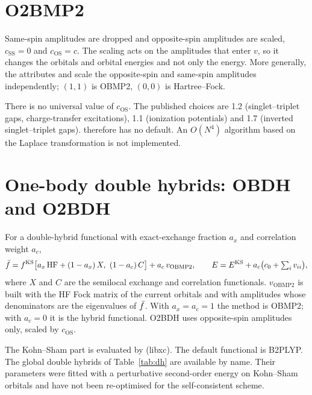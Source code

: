 \section{O2BMP2}
\label{sec:theory-o2bmp2}

Same-spin amplitudes are dropped and opposite-spin amplitudes are scaled,
$c_{\mathrm{SS}}=0$ and $c_{\mathrm{OS}}=c$. The scaling acts on the amplitudes
that enter $v$, so it changes the orbitals and orbital energies and not only
the energy. More generally, the attributes  and  scale
the opposite-spin and same-spin amplitudes independently; $(1,1)$ is OBMP2,
$(0,0)$ is Hartree--Fock.

There is no universal value of $c_{\mathrm{OS}}$. The published choices are
1.2 (singlet--triplet gaps, charge-transfer excitations), 1.1 (ionization
potentials) and 1.7 (inverted singlet--triplet gaps). 
therefore has no default. An $O(N^4)$ algorithm based on the Laplace
transformation is not implemented.

\section{One-body double hybrids: OBDH and O2BDH}
\label{sec:theory-obdh}

For a double-hybrid functional with exact-exchange fraction $a_x$ and
correlation weight $a_c$,
\begin{equation}
  \bar f = f^{\mathrm{KS}}\big[a_x\,\mathrm{HF} + (1-a_x)\,X,\ (1-a_c)\,C\big]
          + a_c\,v_{\mathrm{OBMP2}},
  \qquad
  E = E^{\mathrm{KS}} + a_c\big(c_0 + \textstyle\sum_i v_{ii}\big),
\end{equation}
where $X$ and $C$ are the semilocal exchange and correlation functionals.
$v_{\mathrm{OBMP2}}$ is built with the HF Fock matrix of the current orbitals
and with amplitudes whose denominators are the eigenvalues of $\bar f$. With
$a_x=a_c=1$ the method is OBMP2; with $a_c=0$ it is the hybrid functional.
O2BDH uses opposite-spin amplitudes only, scaled by $c_{\mathrm{OS}}$.

The Kohn--Sham part is evaluated by \pyscf{} (libxc). The default functional
is B2PLYP. The global double hybrids of Table~\ref{tab:dh} are available by
name. Their parameters were fitted with a perturbative second-order energy on
Kohn--Sham orbitals and have not been re-optimised for the self-consistent
scheme.

